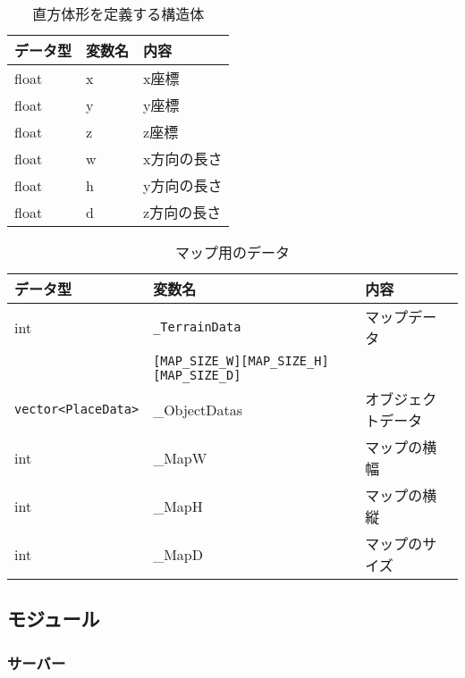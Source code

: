 \documentclass{jarticle}
\begin{document}
\begin{table}[H]
    \caption{直方体形を定義する構造体}
    \label{table:data4}
    \begin{center}
    \begin{tabular}{|l||l|l|}\hline
    データ型 & 変数名 & 内容　\\ \hline
    float & x & x座標 \\ \hline
    float & y & y座標 \\ \hline
    float & z & z座標 \\ \hline
    float & w & x方向の長さ \\ \hline
    float & h & y方向の長さ \\ \hline
    float & d & z方向の長さ \\ \hline
    \end{tabular}
    \end{center}
\end{table}
\begin{table}[H]
    \caption{マップ用のデータ}
    \label{table:data5}
    \centering
    \begin{tabular}{|l||l|l|}\hline
    データ型 & 変数名 & 内容 \\ \hline
    int & \verb+_TerrainData+  & マップデータ \\
    & \verb+[MAP_SIZE_W][MAP_SIZE_H][MAP_SIZE_D]+ & \\ \hline
    \verb+vector<PlaceData>+ & \_ObjectDatas & オブジェクトデータ \\ \hline
    int & \_MapW & マップの横幅 \\ \hline
    int & \_MapH & マップの横縦 \\ \hline
    int & \_MapD & マップのサイズ \\ \hline
    \end{tabular}
\end{table}

\subsection{モジュール}
\subsubsection{サーバー}
\end{document}
